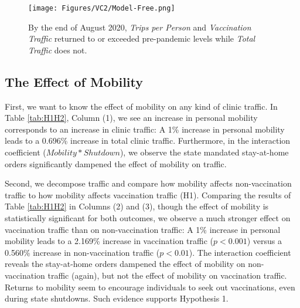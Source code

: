 \begin{landscape}
\begin{figure}
     \centering
     \caption{By the end of August 2020, \textit{Trips per Person} and \textit{Vaccination Traffic} returned to or exceeded pre-pandemic levels while \textit{Total Traffic} does not.} \medskip
     \texttt{[image: Figures/VC2/Model-Free.png]}     
     \label{fig:model_free_vc2}
\end{figure}
\end{landscape}

\subsection{The Effect of Mobility}
 First, we want to know the effect of mobility on any kind of clinic traffic. In Table \ref{tab:H1H2}, Column (1), we see an increase in personal mobility corresponds to an increase in clinic traffic: A 1\% increase in personal mobility leads to a 0.696\% increase in total clinic traffic. Furthermore, in the interaction coefficient ($Mobility * Shutdown$), we observe the state mandated stay-at-home orders significantly dampened the effect of mobility on traffic.
 
 Second, we decompose traffic and compare how mobility affects non-vaccination traffic to how mobility affects vaccination traffic (H1). Comparing the results of Table \ref{tab:H1H2} in Columns (2) and (3), though the effect of mobility is statistically significant for both outcomes, we observe a much stronger effect on vaccination traffic than on non-vaccination traffic: A 1\% increase in personal mobility leads to a 2.169\% increase in vaccination traffic ($p < 0.001$) versus a 0.560\% increase in non-vaccination traffic ($p < 0.01$). The interaction coefficient reveals the stay-at-home orders dampened the effect of mobility on non-vaccination traffic (again), but not the effect of mobility on vaccination traffic. Returns to mobility seem to encourage individuals to seek out vaccinations, even during state shutdowns. Such evidence supports Hypothesis 1.
 
